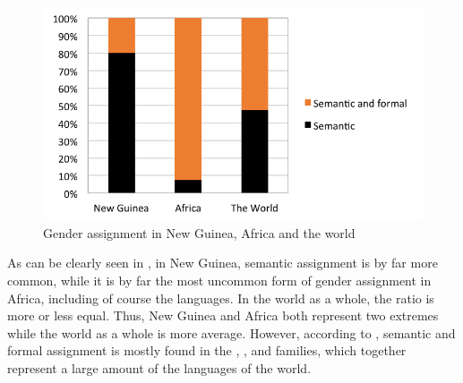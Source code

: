 \documentclass[output=collectionpaper]{langsci/langscibook}
\begin{document}
\begin{figure}
\includegraphics[width=.8\textwidth]{figures/09/fig9.png}
\caption{Gender assignment in New Guinea, Africa and the world}
\label{fig:Svard:9}


\end{figure}


As can be clearly seen in , in New Guinea, semantic assignment is by far more common, while it is by far the most uncommon form of gender assignment in Africa, including of course the  languages. In the world as a whole, the ratio is more or less equal. Thus, New Guinea and Africa both represent two extremes while the world as a whole is more average. However, according to \citet{Corbett2013b}, semantic and formal assignment is mostly found in the , , and  families, which together represent a large amount of the languages of the world.
\end{document}
